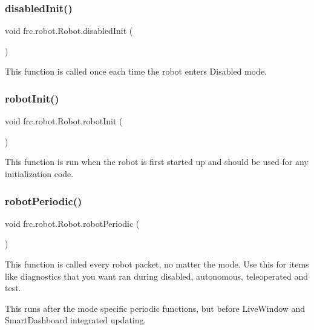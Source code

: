\subsubsection{\texorpdfstring{disabledInit()}{disabledInit()}}
{\footnotesize\ttfamily void frc.\+robot.\+Robot.\+disabled\+Init (\begin{DoxyParamCaption}{ }\end{DoxyParamCaption})\hspace{0.3cm}{\ttfamily [inline]}}

This function is called once each time the robot enters Disabled mode. \mbox{\label{classfrc_1_1robot_1_1_robot_a1d28582cf3dc31568c3581f631c92f13}} 
\subsubsection{\texorpdfstring{robotInit()}{robotInit()}}
{\footnotesize\ttfamily void frc.\+robot.\+Robot.\+robot\+Init (\begin{DoxyParamCaption}{ }\end{DoxyParamCaption})\hspace{0.3cm}{\ttfamily [inline]}}

This function is run when the robot is first started up and should be used for any initialization code. \mbox{\label{classfrc_1_1robot_1_1_robot_a7e63e32ebe8ad3d33bbc3b09092a9f1f}} 
\subsubsection{\texorpdfstring{robotPeriodic()}{robotPeriodic()}}
{\footnotesize\ttfamily void frc.\+robot.\+Robot.\+robot\+Periodic (\begin{DoxyParamCaption}{ }\end{DoxyParamCaption})\hspace{0.3cm}{\ttfamily [inline]}}

This function is called every robot packet, no matter the mode. Use this for items like diagnostics that you want ran during disabled, autonomous, teleoperated and test.

This runs after the mode specific periodic functions, but before Live\+Window and Smart\+Dashboard integrated updating. \mbox{\label{classfrc_1_1robot_1_1_robot_ae807171661cbc29081bc10f06d6831e7}} 
